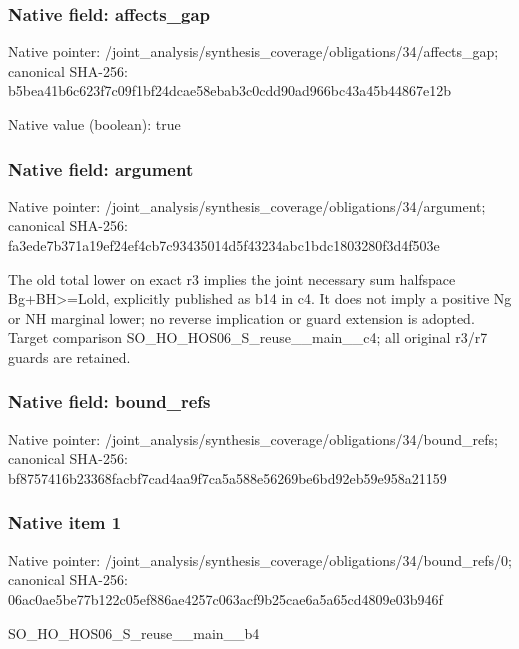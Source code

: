 \documentclass[10pt,a4paper]{article}
\begin{document}
\subsubsection{Native field: affects\_\allowbreak{}gap}
Native pointer: /joint\_\allowbreak{}analysis/synthesis\_\allowbreak{}coverage/obligations/34/affects\_\allowbreak{}gap; canonical SHA-256: b5bea41b6c623f7c09f1bf24dcae58ebab3c0cdd90ad966bc43a45b44867e12b

Native value (boolean): true

\subsubsection{Native field: argument}
Native pointer: /joint\_\allowbreak{}analysis/synthesis\_\allowbreak{}coverage/obligations/34/argument; canonical SHA-256: fa3ede7b371a19ef24ef4cb7c93435014d5f43234abc1bdc1803280f3d4f503e

\begingroup\raggedright\sloppy The old total lower on exact r3 implies the joint necessary sum halfspace Bg+BH>=\allowbreak{}Lold,\allowbreak{} explicitly published as b14 in c4. It does not imply a positive Ng or NH marginal lower;\allowbreak{} no reverse implication or guard extension is adopted. Target comparison SO\_\allowbreak{}HO\_\allowbreak{}HOS06\_\allowbreak{}S\_\allowbreak{}reuse\_\allowbreak{}\_\allowbreak{}main\_\allowbreak{}\_\allowbreak{}c4;\allowbreak{} all original r3/\allowbreak{}r7 guards are retained.\par\endgroup

\subsubsection{Native field: bound\_\allowbreak{}refs}
Native pointer: /joint\_\allowbreak{}analysis/synthesis\_\allowbreak{}coverage/obligations/34/bound\_\allowbreak{}refs; canonical SHA-256: bf8757416b23368facbf7cad4aa9f7ca5a588e56269be6bd92eb59e958a21159

\subsubsection{Native item 1}
Native pointer: /joint\_\allowbreak{}analysis/synthesis\_\allowbreak{}coverage/obligations/34/bound\_\allowbreak{}refs/0; canonical SHA-256: 06ac0ae5be77b122c05ef886ae4257c063acf9b25cae6a5a65cd4809e03b946f

\begingroup\raggedright\sloppy SO\_\allowbreak{}HO\_\allowbreak{}HOS06\_\allowbreak{}S\_\allowbreak{}reuse\_\allowbreak{}\_\allowbreak{}main\_\allowbreak{}\_\allowbreak{}b4\par\endgroup
\end{document}
